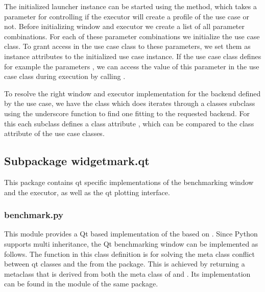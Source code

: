 

The initialized launcher instance can be started using the
 method, which takes a parameter
 for controlling if the executor will create a
profile of the use case or not. Before initializing window and executor we
create a list of all parameter combinations. For each of these parameter
combinations we initialize the use case class. To grant access in the use case
class to these parameters, we set them as instance attributes to the initialized
use case instance. If the use case class defines for example the parameters
, we can access the value of this
parameter in the use case class during execution by calling 
.



To resolve the right window and executor implementation for the backend defined
by the use case, we have the class  which
does iterates through a classes subclass using the underscore function
 to find one fitting to the requested
backend. For this each subclass defines a class attribute
, which can be compared to the
 class attribute of the use case classes.

\subsection{Subpackage widgetmark.qt}

This package contains qt specific implementations of the benchmarking window and
the executor, as well as the qt plotting interface.

\subsubsection*{benchmark.py}

This module provides a Qt based implementation of the
 based on 
. Since Python supports multi
inheritance, the Qt benchmarking window can be implemented as follows. The
 function in this class definition is for
solving the meta class conflict between qt classes and the
 from the  package. This is
achieved by returning a metaclass that is derived from both the meta class of
 and . Its
implementation can be found in the  module of the
same package.

